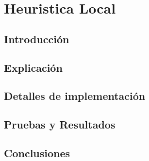 \section {Heuristica Local}
\subsection{Introducción}


\subsection{Explicación}


\subsection{Detalles de implementación}


\subsection{Pruebas y Resultados}


\subsection{Conclusiones}

